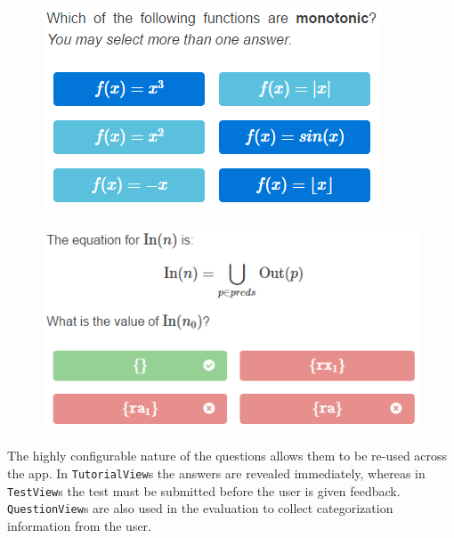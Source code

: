 \documentclass[bsc,twoside,singlespacing,parskip,logo,notimes,normalheadings]{infthesis}
\begin{document}
        \begin{figure}[!ht]
          \vspace{4mm}
          \hspace{2mm}
          \begin{minipage}{.43\textwidth}
            \includegraphics[width=\textwidth]{img/multiple-choice-q.png}
            \captionsetup{width=\textwidth, justification=centering}
            \label{fig:multi-choice-q}
          \end{minipage}%
          \quad
          \begin{minipage}{.53\textwidth}
            \includegraphics[width=\textwidth, trim=0 0 0 22]{img/answered-q.png}
            \captionsetup{width=\textwidth, justification=centering}
            \label{fig:answered-q}
          \end{minipage}
        \end{figure}

        The highly configurable nature of the questions allows them to
        be re-used across the app. In {\tt TutorialView}s the answers
        are revealed immediately, whereas in {\tt TestView}s the test
        must be submitted before the user is given feedback. {\tt
          QuestionView}s are also used in the evaluation to collect
        categorization information from the user.
\end{document}
